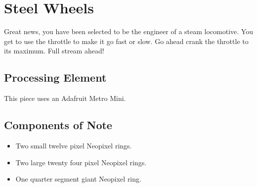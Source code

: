 %
%
%
%
% 
%
%
%
%
%
% 
%

\section{Steel Wheels}

Great news, you have been selected to be the engineer of a steam locomotive. 
You get to use the throttle to make it go fast or slow.  Go ahead crank the 
throttle to its maximum.  Full stream ahead!


\subsection*{Processing Element}

This piece uses an Adafruit Metro Mini.

\subsection*{Components of Note}

\begin{itemize}
\item Two small twelve pixel Neopixel rings.
\item Two large twenty four pixel Neopixel rings.
\item One quarter segment giant Neopixel ring.
\end{itemize}

